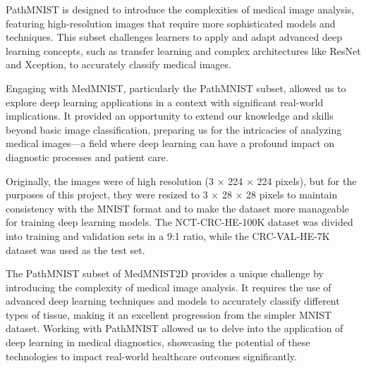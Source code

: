 PathMNIST is designed to introduce the complexities of medical image analysis, featuring high-resolution images that require more sophisticated models and techniques. This subset challenges learners to apply and adapt advanced deep learning concepts, such as transfer learning and complex architectures like ResNet and Xception, to accurately classify medical images.

Engaging with MedMNIST, particularly the PathMNIST subset, allowed us to explore deep learning applications in a context with significant real-world implications. It provided an opportunity to extend our knowledge and skills beyond basic image classification, preparing us for the intricacies of analyzing medical images—a field where deep learning can have a profound impact on diagnostic processes and patient care.



Originally, the images were of high resolution (3 × 224 × 224 pixels), but for the purposes of this project, they were resized to 3 × 28 × 28 pixels to maintain consistency with the MNIST format and to make the dataset more manageable for training deep learning models. The NCT-CRC-HE-100K dataset was divided into training and validation sets in a 9:1 ratio, while the CRC-VAL-HE-7K dataset was used as the test set.

The PathMNIST subset of MedMNIST2D provides a unique challenge by introducing the complexity of medical image analysis. It requires the use of advanced deep learning techniques and models to accurately classify different types of tissue, making it an excellent progression from the simpler MNIST dataset. Working with PathMNIST allowed us to delve into the application of deep learning in medical diagnostics, showcasing the potential of these technologies to impact real-world healthcare outcomes significantly.
